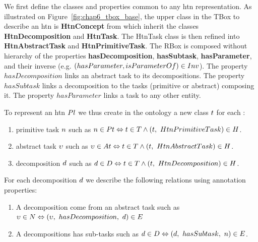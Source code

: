 We first define the classes and properties common to any \acrshort{htn} representation.
As illustrated on Figure~\ref{fig:chap6_tbox_base}, the upper class in the TBox to describe an \acrshort{htn} is \textbf{HtnConcept} from which inherit the classes \textbf{HtnDecomposition} and \textbf{HtnTask}. The HtnTask class is then refined into \textbf{HtnAbstractTask} and \textbf{HtnPrimitiveTask}.
The RBox is composed without hierarchy of the properties \textbf{hasDecomposition}, \textbf{hasSubtask}, \textbf{hasParameter}, and their inverse (e.g. $(hasParameter, isParameterOf) \in Inv$). The property $hasDecomposition$ links an abstract task to its decompositions. The property $hasSubtask$ links a decomposition to the tasks (primitive or abstract) composing it. The property $hasParameter$ links a task to any other entity.

To represent an \acrshort{htn} $Pl$ we thus create in the ontology a new class $t$ for each :
\begin{enumerate}
	\item primitive task $n$ such as 
$n \in Pt \Leftrightarrow t \in T \wedge (t,\ HtnPrimitiveTask) \in H$.
	\item abstract task $\upsilon$ such as $\upsilon \in At \Leftrightarrow t \in T \wedge (t,\ HtnAbstractTask) \in H$.
	\item decomposition $d$ such as $d \in D \Leftrightarrow t \in T \wedge (t,\ HtnDecomposition) \in H$.
\end{enumerate}

For each decomposition $d$ we describe the following relations using annotation properties:
\begin{enumerate}
	\item A decomposition come from an abstract task such as $\upsilon \in N \Leftrightarrow (\upsilon,\ hasDecomposition,\ d) \in E$
	\item A decompositions has sub-tasks such as $d \in D \Leftrightarrow (d,\ hasSubtask,\ n) \in E$.
\end{enumerate}

